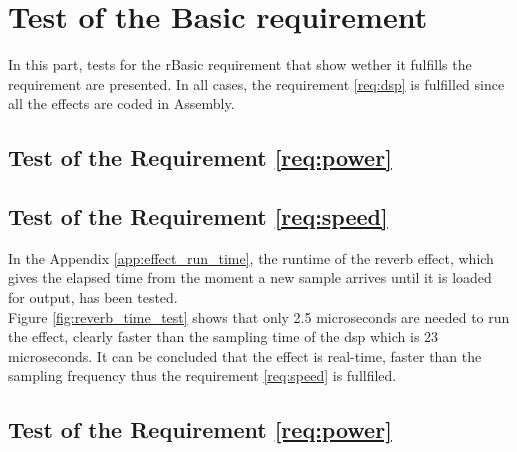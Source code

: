 \section{Test of the Basic requirement}
In this part, tests for the rBasic requirement that show wether it fulfills the requirement are presented. 
In all cases, the requirement \ref{req:dsp} is fulfilled since all the effects are coded in Assembly.


\subsection{Test of the Requirement \autoref{req:power}}



\subsection{Test of the Requirement \autoref{req:speed}}

In the Appendix \ref{app:effect_run_time}, the runtime of the reverb effect, which gives the elapsed time from the moment a new sample arrives until it is loaded for output, has been tested. \\
Figure \ref{fig:reverb_time_test} shows that only 2.5 microseconds are needed to run the effect, clearly faster than the sampling time of the \gls{dsp} which is 23 microseconds. It can be concluded that the effect is real-time, faster than the sampling frequency thus the requirement \ref{req:speed} is fullfiled. 

\subsection{Test of the Requirement \autoref{req:power}}